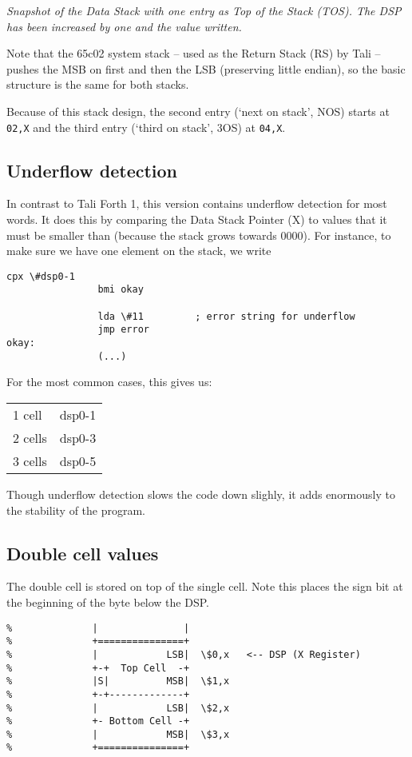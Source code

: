 \textit{Snapshot of the Data Stack with one entry as Top of the Stack (TOS). The
DSP has been increased by one and the value written.}

Note that the 65c02 system stack -- used as the Return Stack (RS) by Tali --
pushes the MSB on first and then the LSB (preserving little endian), so the
basic structure is the same for both stacks. 

Because of this stack design, the second entry (`next on stack', NOS) starts at
\texttt{02,X} and the third entry (`third on stack', 3OS) at \texttt{04,X}. 

\subsection{Underflow detection} 
In contrast to Tali Forth 1, this version contains underflow detection for most
words. It does this by comparing the Data Stack Pointer (X) to values that it
must be smaller than (because the stack grows towards 0000). For instance, to
make sure we have one element on the stack, we write

\begin{lstlisting}[frame=single]
                cpx \#dsp0-1
                bmi okay

                lda \#11         ; error string for underflow
                jmp error
okay:
                (...)
\end{lstlisting}

For the most common cases, this gives us:

\begin{tabular}{ l c }
        1  cell   &  dsp0-1\\
        2  cells  &  dsp0-3\\
        3  cells  &  dsp0-5\\
\end{tabular}

Though underflow detection slows the code down slighly, it adds enormously to
the stability of the program.

\subsection{Double cell values}

The double cell is stored on top of the single cell.
Note this places the sign bit at the beginning of the byte below the DSP.

\begin{lstlisting}[frame=single]
%              +---------------+
%              |               |  
%              +===============+  
%              |            LSB|  \$0,x   <-- DSP (X Register) 
%              +-+  Top Cell  -+         
%              |S|          MSB|  \$1,x
%              +-+-------------+ 
%              |            LSB|  \$2,x
%              +- Bottom Cell -+         
%              |            MSB|  \$3,x   
%              +===============+ 
\end{lstlisting}

